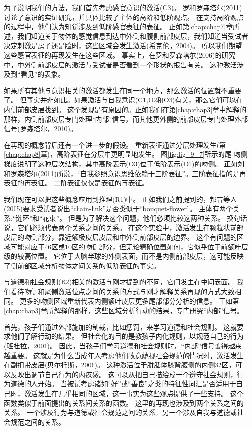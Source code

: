 为了说明我们的方法，我们首先考虑感官意识的激活(C3)。
罗和罗森塔尔(2011)讨论了意识的实证研究，并具体比较了主体的高阶和低阶观点。
在支持高阶观点的过程中，他们认为知觉涉及到低阶感官表征的表征。
正如第\ref{chap:chap7}章所述，我们知道关于物体的感觉信息到达中外侧和腹侧前部皮层，我们知道当受试者决定刺激是房子还是脸时，这些区域会发生激活(希克伦，2004)。
所以我们期望这些感官表征的再现发生在这些区域。
事实上，在罗和罗森塔尔(2006)的研究中，中外侧前部皮层的激活与受试者是否看到一个形状的报告有关。
这种激活涉及到“看见”的表象。



如果所有其他与意识相关的激活都发生在同一个地方，那么激活的位置就不重要了。
但事实并非如此。如果激活与自我意识(O1,O2和O3)有关，那么它们可以在内侧前部皮层找到。
这个发现是有原因的。正如我们在第\ref{chap:chap3}章中解释的那样，内侧前部皮层专门处理“内部”信号，而其他更外侧的前部皮层专门处理外部信号(罗森塔尔，2010)。


在再现的概念背后还有一个进一步的假设。
重新表征通过分层处理发生(第\ref{chap:chap8}章)，高阶表征在分层中更明显地发生。
图\ref{fig:fig_9_7}所示的尾-吻侧梯度说明了这种层次结构，其中高阶表示(O3)位于低阶表示(O1)的吻侧。
正如刘和罗森塔尔(2011)所说，“自我参照意识思维依赖于三阶表征”。三阶表征指的是再表征的再表征。
二阶表征仅仅是表征的再表征。


我们现在可以把这些概念应用到推理(R1)中。
正如我们之前提到的，邦吉等人(2005)要求受试者说出“chain-link”是否类似于“bouquet-flower”。
主体有两个关系:“链环”和“花束”。
但是为了解决这个问题，他们必须比较这两种关系。
换句话说，它们必须代表两个关系之间的关系。
在这个实验中，激活发生在颗粒状前部皮层的吻侧部分，靠近额极皮层皮层和中外侧前部皮层的边界。
这个有问题的区域可能对应于46区或10区的吻侧部分，但无论精确位置如何，它似乎位于前额叶层级的较高位置。
它位于大脑半球的外侧表面，而不是内侧前部皮层，这可能反映了侧前部区域分析物体之间关系的低阶表征的事实。


与道德和社会规则(R2)相关的激活与刚才提到的不同，它们发生在中间表面。
我们看待吻侧和尾侧激活位点之间的关系的方式与刚才解释关系再现的方式大致相同。
更多的吻侧区域重新代表内侧额叶皮层更多尾部部分分析的信息。
正如第\ref{chap:chap3}章所解释的那样，这些区域分析行动的结果，专门研究“内部”信号。


首先，孩子们通过外部施加的制裁，比如惩罚，来学习道德和社会规则。
这就要求他们了解行动的结果。
但社会化的目的是教孩子内化规则，以规范自己的行为(班杜拉，2001)。
因此，当孩子们学习道德和社会规则时，“内部”信号变得越来越重要。
这就是为什么当成年人考虑他们故意藐视社会规范的情况时，激活发生在副扣带皮层(贝尔托斯，2006)。
这种激活位于胼胝体膝背腹侧的内侧32区，可以反映出调节自己行为的内疚感。
这可以从把自己描绘成一个遵守社会规则，行为道德的人开始。
当被试考虑诸如“好”或“善良”之类的特征性词汇是否适用于自己时，激活发生在几乎相同的区域，这一事实为这些观点提供了一些支持。
这个函数类似于前面提出的关系间关系的函数。
这里的再现也涉及到两个关系之间的关系。
一个涉及行为与道德或社会规范之间的关系，另一个涉及自我与道德或社会规范之间的关系。



